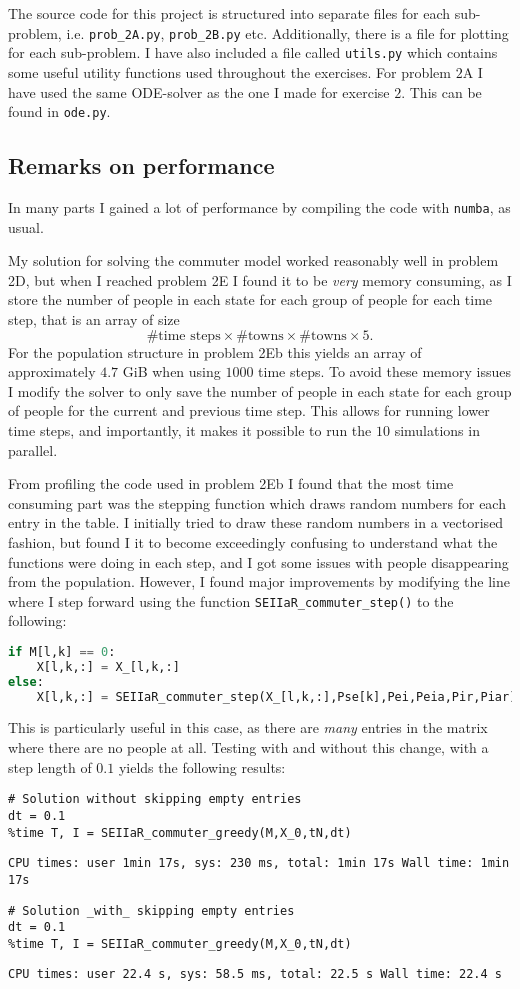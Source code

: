 The source code for this project is structured into separate files for each sub-problem, i.e. \lstinline|prob_2A.py|, \lstinline|prob_2B.py| etc. Additionally, there is a file for plotting for each sub-problem. I have also included a file called \lstinline|utils.py| which contains some useful utility functions used throughout the exercises. For problem $2$A I have used the same ODE-solver as the one I made for exercise $2$. This can be found in \lstinline|ode.py|.

\subsection{Remarks on performance}

In many parts I gained a lot of performance by compiling the code with \lstinline|numba|, as usual.

My solution for solving the commuter model worked reasonably well in problem 2D, but when I reached problem 2E I found it to be \textit{very} memory consuming, as I store the number of people in each state for each group of people for each time step, that is an array of size
$$
	\#\text{time steps}\times\#\text{towns} \times\#\text{towns} \times 5.
$$ 
For the population structure in problem 2Eb this yields an array of approximately $4.7$ GiB when using $1000$ time steps. To avoid these memory issues I modify the solver to only save the number of people in each state for each group of people for the current and previous time step. This allows for running lower time steps, and importantly, it makes it possible to run the $10$ simulations in parallel. 

From profiling the code used in problem 2Eb I found that the most time consuming part was the stepping function which draws random numbers for each entry in the table. I initially tried to draw these random numbers in a vectorised fashion, but found I it to become exceedingly confusing to understand what the functions were doing in each step, and I got some issues with people disappearing from the population. However, I found major improvements by modifying the line where I step forward using the function \lstinline|SEIIaR_commuter_step()| to the following:
\begin{lstlisting}[language=Python]
if M[l,k] == 0:
    X[l,k,:] = X_[l,k,:]
else:
    X[l,k,:] = SEIIaR_commuter_step(X_[l,k,:],Pse[k],Pei,Peia,Pir,Piar)
\end{lstlisting} 

This is particularly useful in this case, as there are \textit{many} entries in the matrix where there are no people at all. Testing with and without this change, with a step length of $0.1$ yields the following results:
\begin{lstlisting}
# Solution without skipping empty entries
dt = 0.1
%time T, I = SEIIaR_commuter_greedy(M,X_0,tN,dt)
\end{lstlisting}
\texttt{\small CPU times: user 1min 17s, sys: 230 ms, total: 1min 17s
Wall time: 1min 17s}
\begin{lstlisting}
# Solution _with_ skipping empty entries
dt = 0.1
%time T, I = SEIIaR_commuter_greedy(M,X_0,tN,dt)
\end{lstlisting}
\texttt{\small CPU times: user 22.4 s, sys: 58.5 ms, total: 22.5 s
Wall time: 22.4 s}